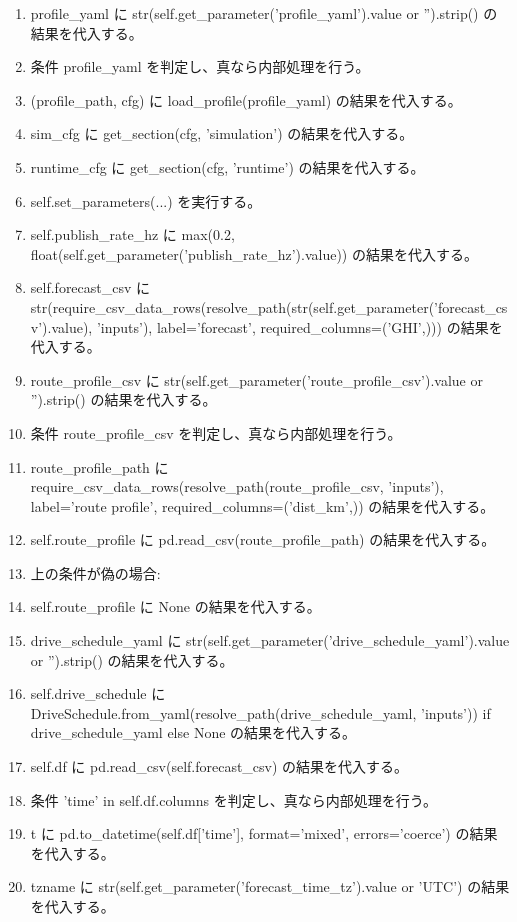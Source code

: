 \documentclass[a4paper,11pt]{article}
\begin{document}
\begin{enumerate}[leftmargin=1.8em]
\item profile\_yaml に str(self.get\_parameter('profile\_yaml').value or '').strip() の結果を代入する。
\item 条件 profile\_yaml を判定し、真なら内部処理を行う。
\item   (profile\_path, cfg) に load\_profile(profile\_yaml) の結果を代入する。
\item   sim\_cfg に get\_section(cfg, 'simulation') の結果を代入する。
\item   runtime\_cfg に get\_section(cfg, 'runtime') の結果を代入する。
\item   self.set\_parameters(...) を実行する。
\item self.publish\_rate\_hz に max(0.2, float(self.get\_parameter('publish\_rate\_hz').value)) の結果を代入する。
\item self.forecast\_csv に str(require\_csv\_data\_rows(resolve\_path(str(self.get\_parameter('forecast\_csv').value), 'inputs'), label='forecast', required\_columns=('GHI',))) の結果を代入する。
\item route\_profile\_csv に str(self.get\_parameter('route\_profile\_csv').value or '').strip() の結果を代入する。
\item 条件 route\_profile\_csv を判定し、真なら内部処理を行う。
\item   route\_profile\_path に require\_csv\_data\_rows(resolve\_path(route\_profile\_csv, 'inputs'), label='route profile', required\_columns=('dist\_km',)) の結果を代入する。
\item   self.route\_profile に pd.read\_csv(route\_profile\_path) の結果を代入する。
\item   上の条件が偽の場合:
\item   self.route\_profile に None の結果を代入する。
\item drive\_schedule\_yaml に str(self.get\_parameter('drive\_schedule\_yaml').value or '').strip() の結果を代入する。
\item self.drive\_schedule に DriveSchedule.from\_yaml(resolve\_path(drive\_schedule\_yaml, 'inputs')) if drive\_schedule\_yaml else None の結果を代入する。
\item self.df に pd.read\_csv(self.forecast\_csv) の結果を代入する。
\item 条件 'time' in self.df.columns を判定し、真なら内部処理を行う。
\item   t に pd.to\_datetime(self.df['time'], format='mixed', errors='coerce') の結果を代入する。
\item   tzname に str(self.get\_parameter('forecast\_time\_tz').value or 'UTC') の結果を代入する。

\end{enumerate}
\end{document}
